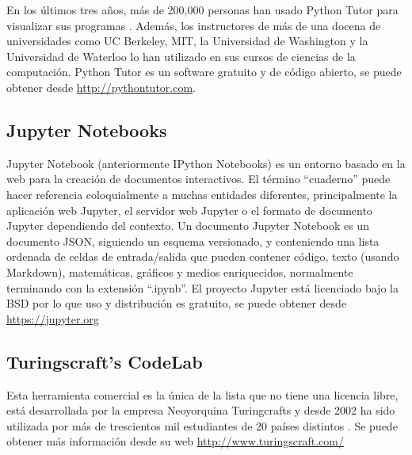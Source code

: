 En los últimos tres años, más de 200,000 personas han usado Python Tutor para visualizar sus programas \cite{GuoSIGCSE2013}. Además, los instructores de más de una docena de universidades como UC Berkeley, MIT, la Universidad de Washington y la Universidad de Waterloo lo han utilizado en sus cursos de ciencias de la computación. Python Tutor es un software gratuito y de código abierto, se puede obtener desde \url{http://pythontutor.com}.


\subsection {Jupyter Notebooks}

Jupyter Notebook (anteriormente IPython Notebooks) es un entorno basado en la web para la creación de documentos interactivos. El término ``cuaderno'' puede hacer referencia coloquialmente a muchas entidades diferentes, principalmente la aplicación web Jupyter, el servidor web Jupyter o el formato de documento Jupyter dependiendo del contexto. Un documento Jupyter Notebook es un documento JSON, siguiendo un esquema versionado, y conteniendo una lista ordenada de celdas de entrada/salida que pueden contener código, texto (usando Markdown), matemáticas, gráficos y medios enriquecidos, normalmente terminando con la extensión ``.ipynb''. El proyecto Jupyter está licenciado bajo la BSD por lo que uso y distribución es gratuito, se puede obtener desde \url{https://jupyter.org}

\subsection {Turingscraft's CodeLab}

Esta herramienta comercial es la única de la lista que no tiene una licencia libre, está desarrollada por la empresa Neoyorquina Turingcrafts y desde 2002 ha sido utilizada por más de trescientos mil estudiantes de 20 países distintos \cite{barr_using_2016}. Se puede obtener más información desde su web \url{http://www.turingscraft.com/}


